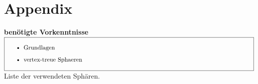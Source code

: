 \documentclass[12pt,titlepage,twoside,cleardoublepage]{article}
\theoremstyle{nummermitklammern}
\numberwithin{equation}{section}
\begin{document}
\section*{Appendix}
\textbf{benötigte Vorkenntnisse} \\
$\fbox{
\parbox{14cm}{\begin{itemize}
\item Grundlagen
\item vertex-treue Sphaeren
\end{itemize}
}}$\\
Liste der verwendeten Sphären.
 

\pagestyle{empty}
\end{document}
